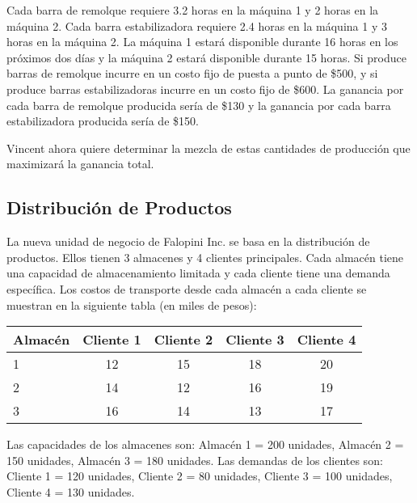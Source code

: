 \documentclass[12pt]{article}
\begin{document}
\vspace{0.5em}

Cada barra de remolque requiere 3.2 horas en la máquina 1 y 2 horas en la máquina 2. Cada barra estabilizadora requiere 2.4 horas en la máquina 1 y 3 horas en la máquina 2. La máquina 1 estará disponible durante 16 horas en los próximos dos días y la máquina 2 estará disponible durante 15 horas. Si produce barras de remolque incurre en un costo fijo de puesta a punto de \$500, y si produce barras estabilizadoras incurre en un costo fijo de \$600. La ganancia por cada barra de remolque producida sería de \$130 y la ganancia por cada barra estabilizadora producida sería de \$150. 

\vspace{0.5em}

Vincent ahora quiere determinar la mezcla de estas cantidades de producción que maximizará la ganancia total.

\subsection{Distribución de Productos}
La nueva unidad de negocio de Falopini Inc. se basa en la distribución de productos. Ellos tienen 3 almacenes y 4 clientes principales. Cada almacén tiene una capacidad de almacenamiento limitada y cada cliente tiene una demanda específica. Los costos de transporte desde cada almacén a cada cliente se muestran en la siguiente tabla (en miles de pesos):

\begin{table}[h]
\centering
\begin{tabular}{lcccc}
\toprule
\textbf{Almacén} & \textbf{Cliente 1} & \textbf{Cliente 2} & \textbf{Cliente 3} & \textbf{Cliente 4} \\
\midrule
1 & 12 & 15 & 18 & 20 \\
2 & 14 & 12 & 16 & 19 \\
3 & 16 & 14 & 13 & 17 \\
\bottomrule
\end{tabular}
\end{table}

Las capacidades de los almacenes son: Almacén 1 = 200 unidades, Almacén 2 = 150 unidades, Almacén 3 = 180 unidades. Las demandas de los clientes son: Cliente 1 = 120 unidades, Cliente 2 = 80 unidades, Cliente 3 = 100 unidades, Cliente 4 = 130 unidades.

\vspace{0.5em}
\end{document}
